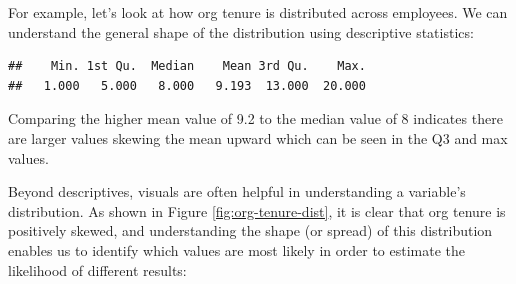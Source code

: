 \documentclass[]{book}
\newenvironment{Shaded}{\begin{snugshade}}{\end{snugshade}}
\newcommand{\CommentTok}[1]{\textcolor[rgb]{0.56,0.35,0.01}{\textit{#1}}}
\newcommand{\DataTypeTok}[1]{\textcolor[rgb]{0.13,0.29,0.53}{#1}}
\newcommand{\FloatTok}[1]{\textcolor[rgb]{0.00,0.00,0.81}{#1}}
\newcommand{\KeywordTok}[1]{\textcolor[rgb]{0.13,0.29,0.53}{\textbf{#1}}}
\newcommand{\NormalTok}[1]{#1}
\newcommand{\OperatorTok}[1]{\textcolor[rgb]{0.81,0.36,0.00}{\textbf{#1}}}
\newcommand{\StringTok}[1]{\textcolor[rgb]{0.31,0.60,0.02}{#1}}
\begin{document}
For example, let's look at how org tenure is distributed across employees. We can understand the general shape of the distribution using descriptive statistics:

\begin{Shaded}
\end{Shaded}

\begin{verbatim}
##    Min. 1st Qu.  Median    Mean 3rd Qu.    Max. 
##   1.000   5.000   8.000   9.193  13.000  20.000
\end{verbatim}

Comparing the higher mean value of 9.2 to the median value of 8 indicates there are larger values skewing the mean upward which can be seen in the Q3 and max values.

Beyond descriptives, visuals are often helpful in understanding a variable's distribution. As shown in Figure \ref{fig:org-tenure-dist}, it is clear that org tenure is positively skewed, and understanding the shape (or spread) of this distribution enables us to identify which values are most likely in order to estimate the likelihood of different results:

\begin{Shaded}
\end{Shaded}
\end{document}
